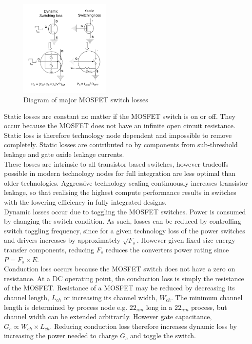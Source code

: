 \documentclass[letterpaper,twocolumn,10pt]{article}
\begin{document}
\begin{figure}[here]
\includegraphics[width=0.4\textwidth]{SwitchLosses}
\caption{Diagram of major MOSFET switch losses}
\label{SWLosses}
\end{figure}

Static losses are constant no matter if the MOSFET switch is on or off. They occur because the MOSFET does not have an infinite open circuit resistance. Static loss is therefore technology node dependent and impossible to remove completely. Static losses are contributed to by components from sub-threshold leakage and gate oxide leakage currents.\\
These losses are intrinsic to all transistor based switches, however tradeoffs possible in modern technology nodes for full integration are less optimal than older technologies. Aggressive technology scaling continuously increases transistor leakage\cite{Iwai2009}, so that realising the highest compute performance results in switches with the lowering efficiency in fully integrated designs.\\
Dynamic losses occur due to toggling the MOSFET switches. Power is consumed by changing the switch condition. As such, losses can be reduced by controlling switch toggling frequency, since for a given technology loss of the power switches and drivers increases by approximately $\sqrt{F_s}$\cite{Andreou1999}. However given fixed size energy transfer components, reducing $F_s$ reduces the converters power rating since $P = F_s \times E$.\\
Conduction loss occurs because the MOSFET switch does not have a zero on resistance. At a DC operating point, the conduction loss is simply the resistance of the MOSFET. Resistance of a MOSFET may be reduced by decreasing its channel length, $L_{ch}$ or increasing its channel width, $W_{ch}$. The minimum channel length is determined by process node e.g. $22_{nm}$ long in a $22_{nm}$ process, but channel width can be extended arbitrarily. However gate capacitance, $G_c \propto W_{ch} \times L_{ch}$. Reducing conduction loss therefore increases dynamic loss by increasing the power needed to charge $G_c$ and toggle the switch.\\  
\end{document}
